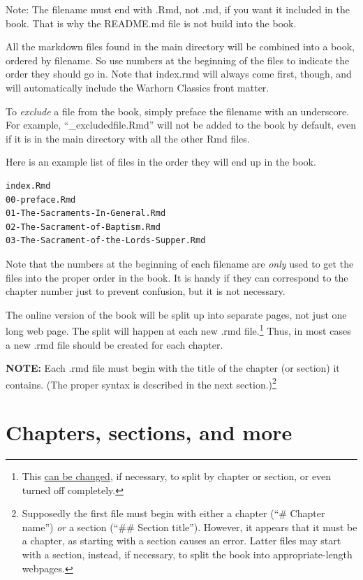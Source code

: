 \documentclass[
  english,
]{book}
\begin{document}
Note: The filename must end with .Rmd, not .md, if you want it included in the book. That is why the README.md file is not build into the book.

All the markdown files found in the main directory will be combined into a book, ordered by filename. So use numbers at the beginning of the files to indicate the order they should go in. Note that index.rmd will always come first, though, and will automatically include the Warhorn Classics front matter.

To \emph{exclude} a file from the book, simply preface the filename with an underscore. For example, ``\_excludedfile.Rmd'' will not be added to the book by default, even if it is in the main directory with all the other Rmd files.

Here is an example list of files in the order they will end up in the book.

\begin{verbatim}
index.Rmd
00-preface.Rmd
01-The-Sacraments-In-General.Rmd
02-The-Sacrament-of-Baptism.Rmd
03-The-Sacrament-of-the-Lords-Supper.Rmd
\end{verbatim}

Note that the numbers at the beginning of each filename are \emph{only} used to get the files into the proper order in the book. It is handy if they can correspond to the chapter number just to prevent confusion, but it is not necessary.

The online version of the book will be split up into separate pages, not just one long web page. The split will happen at each new .rmd file.\footnote{This \href{https://bookdown.org/yihui/bookdown/html.html\#gitbook-style}{can be changed}, if necessary, to split by chapter or section, or even turned off completely.} Thus, in most cases a new .rmd file should be created for each chapter.

\textbf{NOTE:} Each .rmd file must begin with the title of the chapter (or section) it contains. (The proper syntax is described in the next section.)\footnote{Supposedly the first file must begin with either a chapter (``\# Chapter name'') \emph{or} a section (``\#\# Section title''). However, it appears that it must be a chapter, as starting with a section causes an error. Latter files may start with a section, instead, if necessary, to split the book into appropriate-length webpages.}

\hypertarget{chapters-sections-and-more}{%
\section{Chapters, sections, and more}\label{chapters-sections-and-more}}
\end{document}
